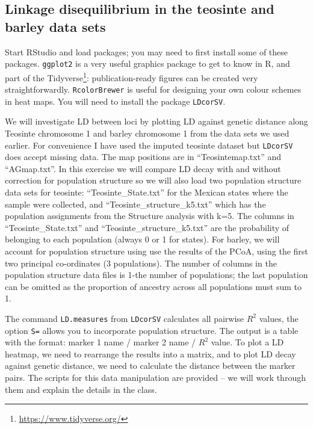 \documentclass[
]{book}
\renewcommand{\href}[2]{#2\footnote{\url{#1}}}
\begin{document}
\hypertarget{linkage-disequilibrium-in-the-teosinte-and-barley-data-sets}{%
\subsection{Linkage disequilibrium in the teosinte and barley data sets}\label{linkage-disequilibrium-in-the-teosinte-and-barley-data-sets}}

Start RStudio and load packages; you may need to first install some of these packages. \texttt{ggplot2} is a very useful graphics package to get to know in R, and part of the \href{https://www.tidyverse.org/}{Tidyverse}: publication-ready figures can be created very straightforwardly. \texttt{RcolorBrewer} is useful for designing your own colour schemes in heat maps. You will need to install the package \texttt{LDcorSV}.

We will investigate LD between loci by plotting LD against genetic distance along Teosinte chromosome 1 and barley chromosome 1 from the data sets we used earlier. For convenience I have used the imputed teosinte dataset but \texttt{LDcorSV} does accept missing data. The map positions are in ``Teosintemap.txt'' and ``AGmap.txt''. In this exercise we will compare LD decay with and without correction for population structure so we will also load two population structure data sets for teosinte: ``Teosinte\_State.txt'' for the Mexican states where the sample were collected, and ``Teosinte\_structure\_k5.txt'' which has the population assignments from the Structure analysis with k=5. The columns in ``Teosinte\_State.txt'' and ``Teosinte\_structure\_k5.txt'' are the probability of belonging to each population (always 0 or 1 for states). For barley, we will account for population structure using use the results of the PCoA, using the first two principal co-ordinates (3 populations). The number of columns in the population structure data files is 1-the number of populations; the last population can be omitted as the proportion of ancestry across all populations must sum to 1.

The command \texttt{LD.measures} from \texttt{LDcorSV} calculates all pairwise \(R^2\) values, the option \texttt{S=} allows you to incorporate population structure. The output is a table with the format: marker 1 name / marker 2 name / \(R^2\) value. To plot a LD heatmap, we need to rearrange the results into a matrix, and to plot LD decay against genetic distance, we need to calculate the distance between the marker pairs. The scripts for this data manipulation are provided -- we will work through them and explain the details in the class.
\end{document}
